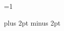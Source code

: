 \ifchorded
  \ifnum\value{AlwaysDisplayChords}=1
    \newcommand{\stopchords}{}
    \newcommand{\resumechords}{}
  \else
    \newcommand{\stopchords}{\chordsoff}
    \newcommand{\resumechords}{\chordson}
  \fi
\else
  \newcommand{\stopchords}{}
  \newcommand{\resumechords}{}
\fi

\newcommand{\stopchordsalways}{\chordsoff}
\newcommand{\resumechordsalways}{\chordson}
%

\newcommand\formatTwoDigits[1]{\ifnum#1<10 0\fi#1}


\noversenumbers

\versesep=5pt plus 2pt minus 2pt

\renewcommand{\printchord}[1]{\rmfamily\bf#1}





\makeatletter
\renewcommand\SB@obeylines{%
  \let\obeyedline\SB@par%
  \obeylines%
  \let\@par\SB@@par%
}
\makeatother

